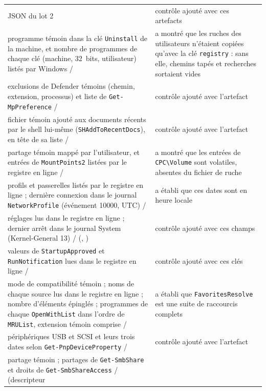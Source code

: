\documentclass[11pt,a4paper,oneside]{report}
\begin{document}
\begin{longtable}{@{}L{6.6cm}L{8.4cm}@{}}
  JSON du lot 2 &
  contrôle ajouté avec ces artefacts \\
programme témoin dans la clé \texttt{Uninstall} de la machine, et nombre de
  programmes de chaque clé (machine, 32~bits, utilisateur) listés par Windows /
   &
  a montré que les ruches des utilisateurs n'étaient copiées qu'avec la clé
  \texttt{registry} : sans elle, chemins tapés et recherches sortaient vides \\
exclusions de Defender témoins (chemin, extension, processus) et liste de
  \texttt{Get-MpPreference} /  &
  contrôle ajouté avec l'artefact \\
fichier témoin ajouté aux documents récents par le shell lui-même
  (\texttt{SHAddToRecentDocs}), en tête de sa liste /  &
  contrôle ajouté avec l'artefact \\
partage témoin mappé par l'utilisateur, et entrées de \texttt{MountPoints2}
  listées par le registre en ligne /  &
  a montré que les entrées de \texttt{CPC\textbackslash Volume} sont volatiles,
  absentes du fichier de ruche \\
profils et passerelles listés par le registre en ligne ; dernière connexion
  dans le journal \texttt{NetworkProfile} (événement 10000, UTC) /
   &
  a établi que ces dates sont en heure locale \\
réglages lus dans le registre en ligne ; dernier arrêt dans le journal System
  (Kernel-General 13) /  (,
  ) &
  contrôle ajouté avec ces champs \\
valeurs de \texttt{StartupApproved} et \texttt{RunNotification} lues dans le
  registre en ligne /  &
  contrôle ajouté avec ces clés \\
mode de compatibilité témoin ; noms de chaque source lus dans le registre en
  ligne ; nombre d'éléments épinglés ; programmes de chaque
  \texttt{OpenWithList} dans l'ordre de \texttt{MRUList}, extension témoin
  comprise /  &
  a établi que \texttt{FavoritesResolve} est une suite de raccourcis complets \\
périphériques USB et SCSI et leurs trois dates selon
  \texttt{Get-PnpDeviceProperty} /  &
  contrôle ajouté avec l'artefact \\
partage témoin ; partages de \texttt{Get-SmbShare} et droits de
  \texttt{Get-SmbShareAccess} /  (descripteur

\end{longtable}
\end{document}
